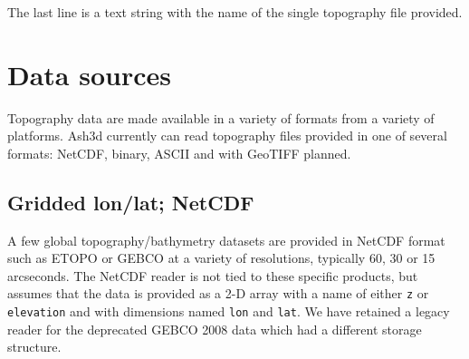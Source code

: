The last line is a text string with the name of the single topography file
provided.

\section{Data sources}\label{ChapAppendTopo_Sec_Data}
Topography data are made available in a variety of formats from a variety
of platforms. Ash3d currently can read topography files provided in one of
several formats: NetCDF, binary, ASCII and with GeoTIFF planned.
\subsection{Gridded lon/lat; NetCDF}
A few global topography/bathymetry datasets are provided in NetCDF format such
as ETOPO \cite{etopo} or GEBCO \cite{gebco} at a variety of resolutions, typically
60, 30 or 15 arcseconds. The NetCDF reader is not tied to these specific products,
but assumes that the data is provided as a 2-D array with a name of either
\texttt{z} or \texttt{elevation} and with dimensions named \texttt{lon} and
\texttt{lat}. We have retained a legacy reader for the deprecated GEBCO 2008
data which had a different storage structure.
